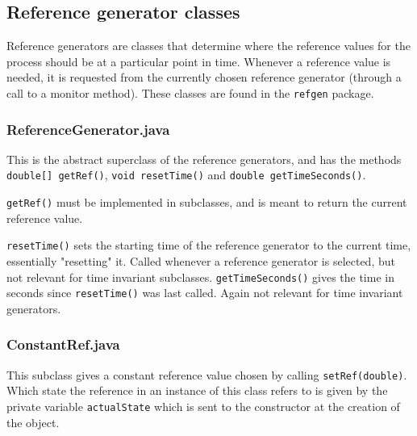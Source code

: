 






\subsection{Reference generator classes}
Reference generators are classes that determine where the reference values for the process should be at a particular point in time. Whenever a reference value is needed, it is requested from the currently chosen reference generator  (through a call to a monitor method). These classes are found in the \texttt{refgen} package.
 
\subsubsection{ReferenceGenerator.java}
This is the abstract superclass of the reference generators, and has the methods \texttt{double[] getRef()}, \texttt{void resetTime()} and \texttt{double getTimeSeconds()}.

\texttt{getRef()} must be implemented in subclasses, and is meant to return the current reference value.


\texttt{resetTime()} sets the starting time of the reference generator to the current time, essentially "resetting" it. Called whenever a reference generator is selected, but not relevant for time invariant subclasses.
\texttt{getTimeSeconds()} gives the time in seconds since \texttt{resetTime()} was last called. Again not relevant for time invariant generators.

\subsubsection{ConstantRef.java}
This subclass gives a constant reference value chosen by calling \texttt{setRef(double)}. Which state the reference in an instance of this class refers to is given by the private variable \texttt{actualState} which is sent to the constructor at the creation of the object.

%

